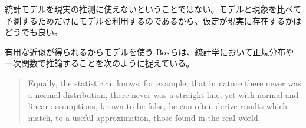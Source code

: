 統計モデルを現実の推測に使えないということではない。モデルと現象を比べて予測するためだけにモデルを利用するのであるから、仮定が現実に存在するかはどうでも良い。



\begin{SMbox}{有用な近似が得られるからモデルを使う}
 Boxらは、統計学において正規分布や一次関数で推論することを次のように捉えている\cite{box1976science}。
 \begin{quote}
  Equally, the statistician knows, for example, that in nature there never was a normal distribution, there never was a straight line, yet with normal and linear assumptions, known to be false, he can often derive results which match, to a useful approximation, those found in the real world. 
 \end{quote}
\end{SMbox}



